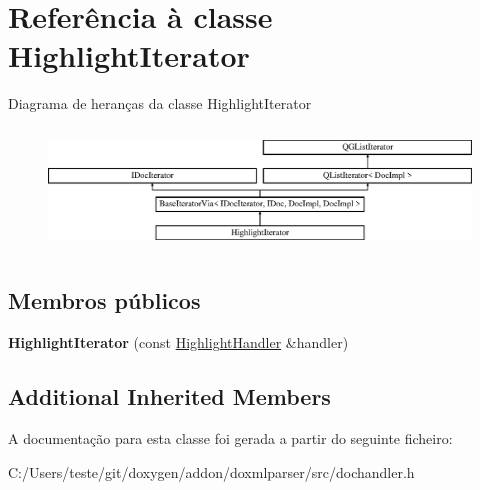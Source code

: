 \hypertarget{class_highlight_iterator}{\section{Referência à classe Highlight\-Iterator}
\label{class_highlight_iterator}
}
Diagrama de heranças da classe Highlight\-Iterator\begin{figure}[H]
\begin{center}
\leavevmode
\includegraphics[height=3.294118cm]{class_highlight_iterator}
\end{center}
\end{figure}
\subsection*{Membros públicos}
\begin{DoxyCompactItemize}
\item 
\hypertarget{class_highlight_iterator_a2bca825f549545588db30a4c58985f15}{{\bfseries Highlight\-Iterator} (const \hyperlink{class_highlight_handler}{Highlight\-Handler} \&handler)}\label{class_highlight_iterator_a2bca825f549545588db30a4c58985f15}

\end{DoxyCompactItemize}
\subsection*{Additional Inherited Members}


A documentação para esta classe foi gerada a partir do seguinte ficheiro\-:\begin{DoxyCompactItemize}
\item 
C\-:/\-Users/teste/git/doxygen/addon/doxmlparser/src/dochandler.\-h\end{DoxyCompactItemize}
